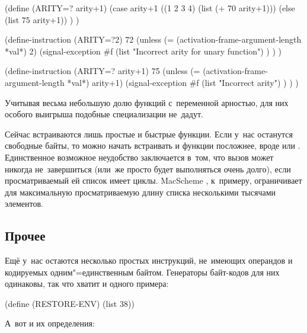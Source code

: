 \begin{code:lisp}
(define (ARITY=? arity+1)
  (case arity+1
    ((1 2 3 4) (list (+ 70 arity+1)))
    (else      (list 75 arity+1)) ) )

(define-instruction (ARITY=?2) 72
  (unless (= (activation-frame-argument-length *val*) 2)
    (signal-exception
     #f (list "Incorrect arity for unary function") ) ) )

(define-instruction (ARITY=? arity+1) 75
  (unless (= (activation-frame-argument-length *val*) arity+1)
    (signal-exception #f (list "Incorrect arity") ) ) )
\end{code:lisp}

Учитывая весьма небольшую долю функций с~переменной арностью, для них особого
выигрыша подобные специализации не~дадут.

Сейчас встраиваются лишь простые и быстрые функции. Если у~нас останутся
свободные байты, то можно начать встраивать и функции посложнее, вроде 
или . Единственное возможное неудобство заключается в~том, что вызов
 может никогда не~завершиться (или~же просто будет выполняться очень
долго), если просматриваемый ей список имеет циклы. MacScheme \cite{85m85},
к~примеру, ограничивает для  максимальную просматриваемую длину списка несколькими
тысячами элементов.


\subsection{Прочее}\label{compilation/instruction/ssect:misc}

Ещё у~нас остаются несколько простых инструкций, не~имеющих операндов и
кодируемых одним"=единственным байтом. Генераторы байт-кодов для них одинаковы,
так что хватит и одного примера:

\begin{code:lisp}
(define (RESTORE-ENV) (list 38))
\end{code:lisp}

\noindent
А~вот и их определения:

